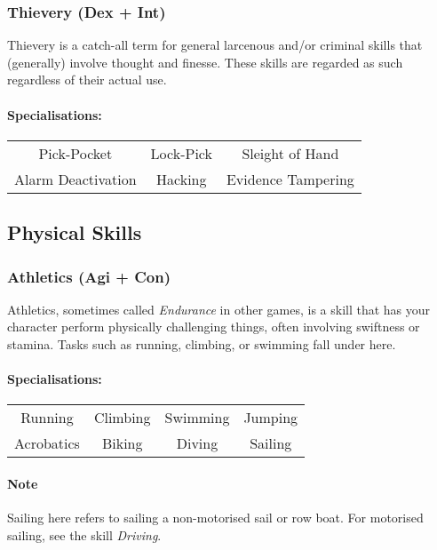 \subsubsection{Thievery (Dex + Int)}
Thievery is a catch-all term for general larcenous and/or criminal skills that (generally) involve thought and finesse.
These skills are regarded as such regardless of their actual use.

\paragraph{Specialisations:}
\begin{center}
    \begin{tabular}{c|c|c}
        Pick-Pocket & Lock-Pick & Sleight of Hand \\
        Alarm Deactivation & Hacking & Evidence Tampering \\
    \end{tabular}
\end{center}

\subsection{Physical Skills}
\subsubsection{Athletics (Agi + Con)}
Athletics, sometimes called \textit{Endurance} in other games, is a skill that has your character perform physically challenging things, often involving swiftness or stamina.
Tasks such as running, climbing, or swimming fall under here.

\paragraph{Specialisations:}
\begin{center}
    \begin{tabular}{c|c|c|c}
        Running & Climbing & Swimming & Jumping \\
        Acrobatics & Biking & Diving & Sailing \\
    \end{tabular}
\end{center}

\paragraph{Note} Sailing here refers to sailing a non-motorised sail or row boat. For motorised sailing, see the skill \textit{Driving}.

